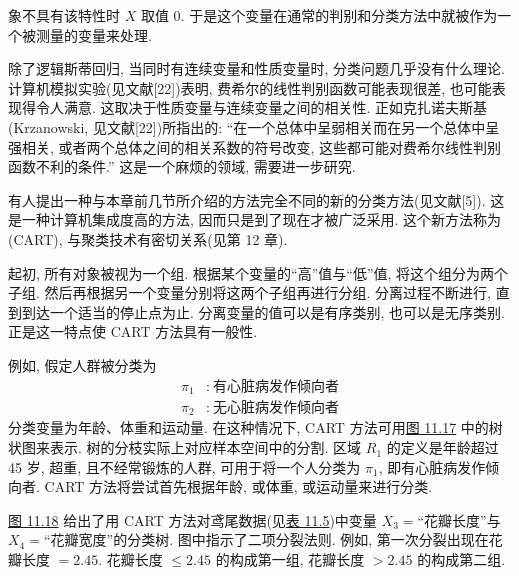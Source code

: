 
象不具有该特性时 $X$ 取值 0. 于是这个变量在通常的判别和分类方法中就被作为一个被测量的变量来处理.

除了逻辑斯蒂回归, 当同时有连续变量和性质变量时, 分类问题几乎没有什么理论. 计算机模拟实验(见文献[22])表明, 费希尔的线性判别函数可能表现很差, 也可能表现得令人满意. 这取决于性质变量与连续变量之间的相关性. 正如克扎诺夫斯基(Krzanowski, 见文献[22])所指出的: “在一个总体中呈弱相关而在另一个总体中呈强相关, 或者两个总体之间的相关系数的符号改变, 这些都可能对费希尔线性判别函数不利的条件.” 这是一个麻烦的领域, 需要进一步研究.


有人提出一种与本章前几节所介绍的方法完全不同的新的分类方法(见文献[5]). 这是一种计算机集成度高的方法, 因而只是到了现在才被广泛采用. 这个新方法称为(CART), 与聚类技术有密切关系(见第 12 章).

起初, 所有对象被视为一个组. 根据某个变量的“高”值与“低”值, 将这个组分为两个子组. 然后再根据另一个变量分别将这两个子组再进行分组. 分离过程不断进行, 直到到达一个适当的停止点为止. 分离变量的值可以是有序类别, 也可以是无序类别. 正是这一特点使 CART 方法具有一般性.

例如, 假定人群被分类为
\[
\begin{aligned}
\pi_1&:\ \text{有心脏病发作倾向者}\\
\pi_2&:\ \text{无心脏病发作倾向者}
\end{aligned}
\]
分类变量为年龄、体重和运动量. 在这种情况下, CART 方法可用\hyperref[fig:11.17]{图 11.17} 中的树状图来表示. 树的分枝实际上对应样本空间中的分割. 区域 $R_1$ 的定义是年龄超过 45 岁, 超重, 且不经常锻炼的人群, 可用于将一个人分类为 $\pi_1$, 即有心脏病发作倾向者. CART 方法将尝试首先根据年龄, 或体重, 或运动量来进行分类.

\hyperref[fig:11.18]{图 11.18} 给出了用 CART 方法对鸢尾数据(见\hyperref[tab:11.5]{表 11.5})中变量 $X_3=$“花瓣长度”与 $X_4=$“花瓣宽度”的分类树. 图中指示了二项分裂法则. 例如, 第一次分裂出现在花瓣长度 $=2.45$. 花瓣长度 $\le 2.45$ 的构成第一组, 花瓣长度 $>2.45$ 的构成第二组.

\begin{mvfigure}
\label{fig:11.17}
\end{mvfigure}

